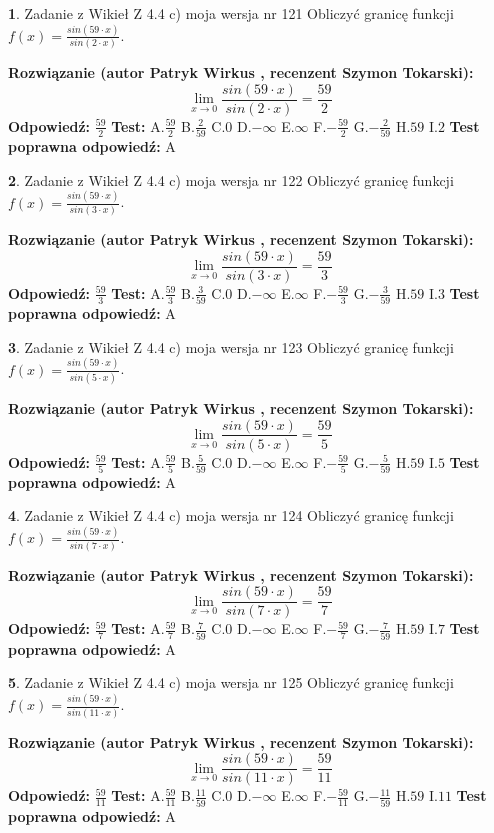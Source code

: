 \documentclass[12pt, a4paper]{article}
\theoremstyle{definition} %
\newtheorem{zad}{}
\newcommand{\zadStart}[1]{\begin{zad}#1\newline}
\newcommand{\zadStop}{\end{zad}}
\newcommand{\rozwStart}[2]{\noindent \textbf{Rozwiązanie (autor #1 , recenzent #2): }\newline}
\newcommand{\rozwStop}{\newline}
\newcommand{\odpStart}{\noindent \textbf{Odpowiedź:}\newline}
\newcommand{\odpStop}{\newline}
\newcommand{\testStart}{\noindent \textbf{Test:}\newline}
\newcommand{\testStop}{\newline}
\newcommand{\kluczStart}{\noindent \textbf{Test poprawna odpowiedź:}\newline}
\newcommand{\kluczStop}{\newline}
\begin{document}
\zadStart{Zadanie z Wikieł Z 4.4 c) moja wersja nr 121}
Obliczyć granicę funkcji $f(x)=\frac{sin(59\cdot x)}{sin(2\cdot x)}$.
\zadStop
\rozwStart{Patryk Wirkus}{Szymon Tokarski}
$$\lim\limits_{x\to 0}\frac{sin(59\cdot x)}{sin(2\cdot x)}=
\frac{59}{2}$$
\rozwStop
\odpStart
$\frac{59}{2}$
\odpStop
\testStart
A.$\frac{59}{2}$
B.$\frac{2}{59}$
C.$0$
D.$-\infty$
E.$\infty$
F.$-\frac{59}{2}$
G.$-\frac{2}{59}$
H.$59$
I.$2$
\testStop
\kluczStart
A
\kluczStop



\zadStart{Zadanie z Wikieł Z 4.4 c) moja wersja nr 122}
Obliczyć granicę funkcji $f(x)=\frac{sin(59\cdot x)}{sin(3\cdot x)}$.
\zadStop
\rozwStart{Patryk Wirkus}{Szymon Tokarski}
$$\lim\limits_{x\to 0}\frac{sin(59\cdot x)}{sin(3\cdot x)}=
\frac{59}{3}$$
\rozwStop
\odpStart
$\frac{59}{3}$
\odpStop
\testStart
A.$\frac{59}{3}$
B.$\frac{3}{59}$
C.$0$
D.$-\infty$
E.$\infty$
F.$-\frac{59}{3}$
G.$-\frac{3}{59}$
H.$59$
I.$3$
\testStop
\kluczStart
A
\kluczStop



\zadStart{Zadanie z Wikieł Z 4.4 c) moja wersja nr 123}
Obliczyć granicę funkcji $f(x)=\frac{sin(59\cdot x)}{sin(5\cdot x)}$.
\zadStop
\rozwStart{Patryk Wirkus}{Szymon Tokarski}
$$\lim\limits_{x\to 0}\frac{sin(59\cdot x)}{sin(5\cdot x)}=
\frac{59}{5}$$
\rozwStop
\odpStart
$\frac{59}{5}$
\odpStop
\testStart
A.$\frac{59}{5}$
B.$\frac{5}{59}$
C.$0$
D.$-\infty$
E.$\infty$
F.$-\frac{59}{5}$
G.$-\frac{5}{59}$
H.$59$
I.$5$
\testStop
\kluczStart
A
\kluczStop



\zadStart{Zadanie z Wikieł Z 4.4 c) moja wersja nr 124}
Obliczyć granicę funkcji $f(x)=\frac{sin(59\cdot x)}{sin(7\cdot x)}$.
\zadStop
\rozwStart{Patryk Wirkus}{Szymon Tokarski}
$$\lim\limits_{x\to 0}\frac{sin(59\cdot x)}{sin(7\cdot x)}=
\frac{59}{7}$$
\rozwStop
\odpStart
$\frac{59}{7}$
\odpStop
\testStart
A.$\frac{59}{7}$
B.$\frac{7}{59}$
C.$0$
D.$-\infty$
E.$\infty$
F.$-\frac{59}{7}$
G.$-\frac{7}{59}$
H.$59$
I.$7$
\testStop
\kluczStart
A
\kluczStop



\zadStart{Zadanie z Wikieł Z 4.4 c) moja wersja nr 125}
Obliczyć granicę funkcji $f(x)=\frac{sin(59\cdot x)}{sin(11\cdot x)}$.
\zadStop
\rozwStart{Patryk Wirkus}{Szymon Tokarski}
$$\lim\limits_{x\to 0}\frac{sin(59\cdot x)}{sin(11\cdot x)}=
\frac{59}{11}$$
\rozwStop
\odpStart
$\frac{59}{11}$
\odpStop
\testStart
A.$\frac{59}{11}$
B.$\frac{11}{59}$
C.$0$
D.$-\infty$
E.$\infty$
F.$-\frac{59}{11}$
G.$-\frac{11}{59}$
H.$59$
I.$11$
\testStop
\kluczStart
A
\kluczStop
\end{document}
